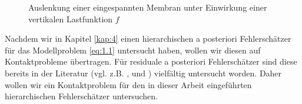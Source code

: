 \begin{figure}[h]
\begin{center}
\hfill
{}
\end{center}
\caption{Auslenkung einer eingespannten Membran unter Einwirkung einer vertikalen Lastfunktion $f$\label{abb:1.1}}
\end{figure}


Nachdem wir in Kapitel \ref{kap:4} einen hierarchischen a posteriori Fehlerschätzer für das Modellproblem \eqref{eq:1.1} untersucht haben, wollen wir diesen auf Kontaktprobleme übertragen. Für residuale a posteriori Fehlerschätzer sind diese bereits in der Literatur (vgl. z.B. \cite{CarWri}, \cite{WriggersContact} und \cite{HanJoh}) vielfältig untersucht worden. Daher wollen wir ein Kontaktproblem für den in dieser Arbeit eingeführten hierarchischen Fehlerschätzer untersuchen.

